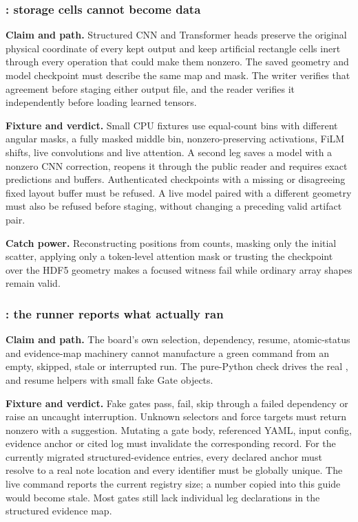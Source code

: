 \subsubsection{: storage cells cannot become data}

\textbf{Claim and path.}  Structured CNN and Transformer heads preserve the
original physical coordinate of every kept output and keep artificial
rectangle cells inert through every operation that could make them nonzero.
The saved geometry and model checkpoint must describe the same map and mask.
The writer verifies that agreement before staging either output file, and the
reader verifies it independently before loading learned tensors.

\textbf{Fixture and verdict.}  Small CPU fixtures use equal-count bins with
different angular masks, a fully masked middle bin, nonzero-preserving
activations, FiLM shifts, live convolutions and live attention.  A second leg
saves a model with a nonzero CNN correction, reopens it through the public
reader and requires exact predictions and buffers.  Authenticated checkpoints
with a missing or disagreeing fixed layout buffer must be refused.  A live
model paired with a different geometry must also be refused before staging,
without changing a preceding valid artifact pair.

\textbf{Catch power.}  Reconstructing positions from counts, masking only the
initial scatter, applying only a token-level attention mask or trusting the
checkpoint over the HDF5 geometry makes a focused witness fail while ordinary
array shapes remain valid.

\subsubsection{: the runner reports what actually ran}

\textbf{Claim and path.}  The board's own selection, dependency, resume,
atomic-status and evidence-map machinery cannot manufacture a green command
from an empty, skipped, stale or interrupted run.  The pure-Python check
drives the real ,  and resume
helpers with small fake Gate objects.

\textbf{Fixture and verdict.}  Fake gates pass, fail, skip through a failed
dependency or raise an uncaught interruption.  Unknown selectors and force
targets must return nonzero with a suggestion.  Mutating a gate body,
referenced YAML, input config, evidence anchor or cited log must invalidate
the corresponding record.  For the currently migrated structured-evidence
entries, every declared anchor must resolve to a real note location and every
identifier must be globally unique.  The live  command reports
the current registry size; a number copied into this guide would become stale.
Most gates still lack individual leg declarations in the structured evidence
map.

